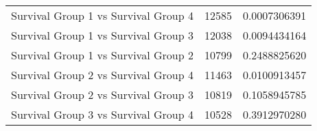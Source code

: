 \begin{longtable}{lll}
\midrule
Survival Group 1 vs Survival Group 4 & 12585 & 0.0007306391 \\ 
Survival Group 1 vs Survival Group 3 & 12038 & 0.0094434164 \\ 
Survival Group 1 vs Survival Group 2 & 10799 & 0.2488825620 \\ 
Survival Group 2 vs Survival Group 4 & 11463 & 0.0100913457 \\ 
Survival Group 2 vs Survival Group 3 & 10819 & 0.1058945785 \\ 
Survival Group 3 vs Survival Group 4 & 10528 & 0.3912970280 \\ 
\bottomrule
\end{longtable}

